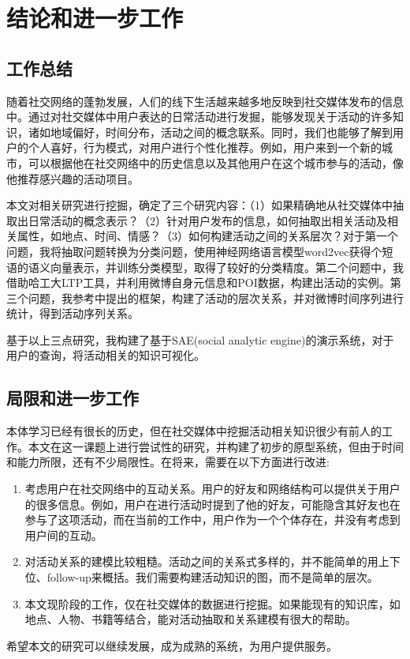 \chapter{结论和进一步工作}

\section{工作总结}

随着社交网络的蓬勃发展，人们的线下生活越来越多地反映到社交媒体发布的信息中。通过对社交媒体中用户表达的日常活动进行发掘，能够发现关于活动的许多知识，诸如地域偏好，时间分布，活动之间的概念联系。同时，我们也能够了解到用户的个人喜好，行为模式，对用户进行个性化推荐。例如，用户来到一个新的城市，可以根据他在社交网络中的历史信息以及其他用户在这个城市参与的活动，像他推荐感兴趣的活动项目。

本文对相关研究进行挖掘，确定了三个研究内容：（1）如果精确地从社交媒体中抽取出日常活动的概念表示？（2）针对用户发布的信息，如何抽取出相关活动及相关属性，如地点、时间、情感？（3）如何构建活动之间的关系层次？对于第一个问题，我将抽取问题转换为分类问题，使用神经网络语言模型word2vec获得个短语的语义向量表示，并训练分类模型，取得了较好的分类精度。第二个问题中，我借助哈工大LTP工具，并利用微博自身元信息和POI数据，构建出活动的实例。第三个问题，我参考\cite{wang2013phrase}中提出的框架，构建了活动的层次关系，并对微博时间序列进行统计，得到活动序列关系。

基于以上三点研究，我构建了基于SAE(social analytic engine)的演示系统，对于用户的查询，将活动相关的知识可视化。

\section{局限和进一步工作}

本体学习已经有很长的历史，但在社交媒体中挖掘活动相关知识很少有前人的工作。本文在这一课题上进行尝试性的研究，并构建了初步的原型系统，但由于时间和能力所限，还有不少局限性。在将来，需要在以下方面进行改进:
\begin{enumerate}
	\item 考虑用户在社交网络中的互动关系。用户的好友和网络结构可以提供关于用户的很多信息。例如，用户在进行活动时提到了他的好友，可能隐含其好友也在参与了这项活动，而在当前的工作中，用户作为一个个体存在，并没有考虑到用户间的互动。
	\item 对活动关系的建模比较粗糙。活动之间的关系式多样的，并不能简单的用上下位、follow-up来概括。我们需要构建活动知识的图，而不是简单的层次。
	\item 本文现阶段的工作，仅在社交媒体的数据进行挖掘。如果能现有的知识库，如地点、人物、书籍等结合，能对活动抽取和关系建模有很大的帮助。
\end{enumerate}

希望本文的研究可以继续发展，成为成熟的系统，为用户提供服务。